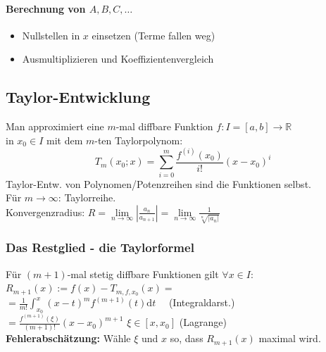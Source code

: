 \documentclass[6pt,a4paper]{scrartcl}
\newcommand{\abs}[1]{\ensuremath{\left\vert#1\right\vert}}
\newcommand{\ra}[0]{\ensuremath{\rightarrow}}
\begin{document}
\begin{multicols*}{4}
\paragraph{Berechnung von $A,B,C,\dots$}
\begin{itemize}\itemsep0pt
\item Nullstellen in $x$ einsetzen (Terme fallen weg)
\item Ausmultiplizieren und Koeffizientenvergleich
\end{itemize}


\subsection{Taylor-Entwicklung}
Man approximiert eine $m$-mal diffbare Funktion $f:I=[a,b] \rightarrow \mathbb R$ \\ in $x_0 \in I$ mit dem $m$-ten Taylorpolynom:\\
\begin{equation*}
T_{m}(x_0;x)= \sum_{i=0}^{m} \frac{f^{(i)}(x_0)}{i!}(x-x_0)^i 
\end{equation*}
Taylor-Entw. von Polynomen/Potenzreihen sind die Funktionen selbst.\\
Für $m \ra \infty$: Taylorreihe. \\
Konvergenzradius: $R = \underset{n\rightarrow \infty}{\lim} \abs{\frac{a_n}{a_{n+1}}}=\lim\limits_{n\rightarrow \infty}\frac{1}{\sqrt[n]{\abs{a_n}}}$

	\subsubsection{Das Restglied - die Taylorformel}
	Für $(m+1)$-mal stetig diffbare Funktionen gilt $\forall x \in I:$\\
	$R_{m+1}(x) := f(x)- T_{m,f,x_0}(x) =$  \\
	$= \frac{1}{m!} \int_{x_0}^{x}(x-t)^m f^{(m+1)}(t)\mathrm dt$ \ \  (Integraldarst.)\\
	$= \frac{f^{(m+1)}(\xi)}{(m+1)!}(x-x_0)^{m+1}$ \quad
	$\xi \in [x, x_0]$ (Lagrange) \\
	\textbf{Fehlerabschätzung:} Wähle $\xi$ und $x$ so, dass $R_{m+1}(x)$ maximal wird.
	

\end{multicols*}
\end{document}
